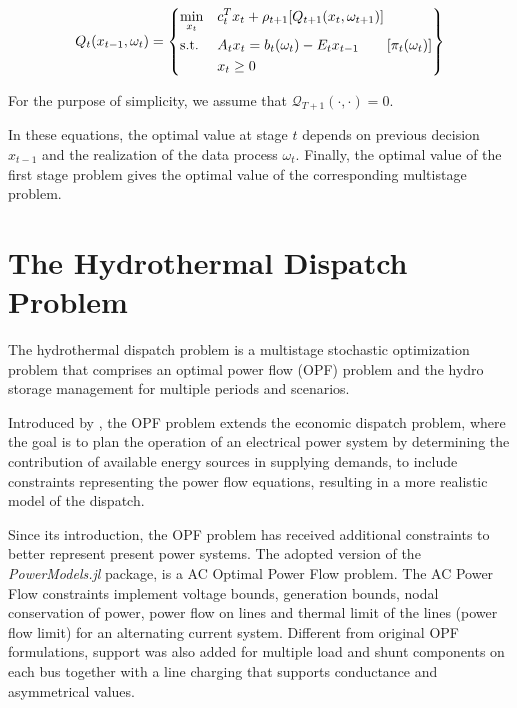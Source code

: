 \documentclass{juliacon}
\begin{document}
 \begin{equation*}
    Q_t(x_{t-1}, \omega_{t}) = \left\{
    \begin{aligned}
    & \underset{x_t}{\text{min}} 
    & & c_t^T x_{t} + \rho_{t+1}[Q_{t+1}(x_{t}, \omega_{t+1})]  \\
    & \text{s.t.} \notag
    & & A_t x_t = b_t(\omega_{t})- E_t x_{t-1} \qquad [\pi_t(\omega_{t})]\\
    & & & x_t \geq 0 \\
    \end{aligned}
    \right\}
\end{equation*}

For the purpose of simplicity, we assume that $\mathcal{Q}_{T+1}(\cdot, \cdot) = 0$.

In these equations, the optimal value at stage $t$ depends on previous decision $x_{t-1}$ and the realization of the data process $\omega_t$. Finally, the optimal value of the first stage problem gives the optimal value of the corresponding multistage problem. 

\section{The Hydrothermal Dispatch Problem}
\label{sec:problemformulation}
%
The hydrothermal dispatch problem is a multistage stochastic optimization problem that comprises an optimal power flow (OPF) problem and the hydro storage management for multiple periods and scenarios. 

Introduced by \cite{carpentier1962contribution}, the OPF problem extends the economic dispatch problem, where the goal is to plan the operation of an electrical power system by determining the contribution of available energy sources in supplying demands, to include constraints representing the power flow equations, resulting in a more realistic model of the dispatch. 

Since its introduction, the OPF problem has received additional constraints to better represent present power systems. The adopted version of the \textit{PowerModels.jl} package, is a AC Optimal Power Flow problem. The AC Power Flow constraints implement voltage bounds, generation bounds, nodal conservation of power, power flow on lines and thermal limit of the lines (power flow limit) for an alternating current system. Different from original OPF formulations, support was also added for multiple load and shunt components on each bus together with a line charging that supports conductance and asymmetrical values.
\end{document}
